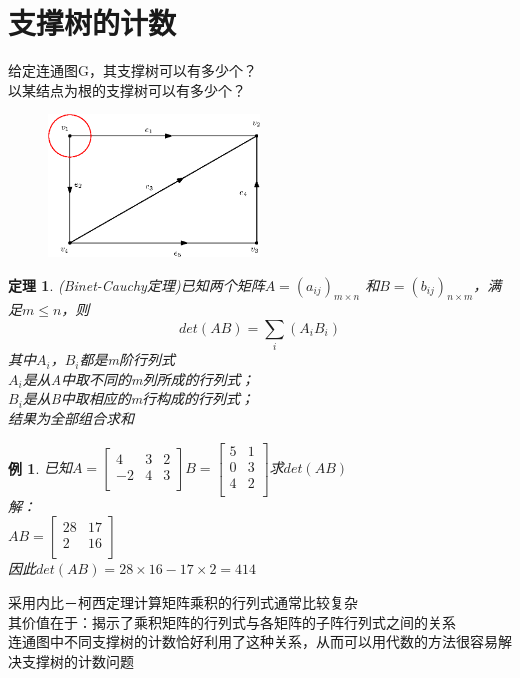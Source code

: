 \documentclass[11pt,a4paper,openany]{book}
\newcommand{\hwxw}{\CJKfamily{hwxw}}
\newtheorem{theorem}{\textbf{定理}}[section]
\newtheorem{sample}{\textbf{例}}[section]
\begin{document}
\section{支撑树的计数}
给定连通图G，其支撑树可以有多少个？\\
以某结点为根的支撑树可以有多少个？
\begin{figure}[H]
  \centering
  \includegraphics[width=0.5\textwidth]{3_5.eps}\\
  \caption*{}
\end{figure}
\begin{theorem}
(Binet-Cauchy定理)已知两个矩阵$A=(a_{ij})_{m\times n}$
和$B=(b_{ij})_{n\times m}$，满足$m\leq n$，则$$ det(AB)=\sum_{i}(A_iB_i)$$
{\hwxw
其中$A_i$，$B_i$都是m阶行列式\\
$A_i$是从A中取不同的m列所成的行列式；\\
$B_i$是从B中取相应的m行构成的行列式；\\
结果为全部组合求和\\
}
\end{theorem}
\begin{sample}
已知$A=\left[
       \begin{array}{ccc}
         4 & 3 & 2 \\
         -2 & 4 & 3 \\
       \end{array}
     \right]
$\quad $B=\left[
           \begin{array}{cc}
             5 & 1 \\
             0 & 3 \\
             4 & 2 \\
           \end{array}
         \right]
$求$det(AB)$\\
解：\\
$AB=\left[
      \begin{array}{cc}
        28 & 17 \\
        2 & 16 \\
      \end{array}
    \right]
$\\
因此$det(AB)=28 \times 16-17\times 2=414$\\
\end{sample}
\begin{shaded}
\noindent 采用内比－柯西定理计算矩阵乘积的行列式通常比较复杂\\
其价值在于：揭示了乘积矩阵的行列式与各矩阵的子阵行列式之间的关系\\
连通图中不同支撑树的计数恰好利用了这种关系，从而可以用代数的方法很容易解决支撑树的计数问题
\end{shaded}
\end{document}

